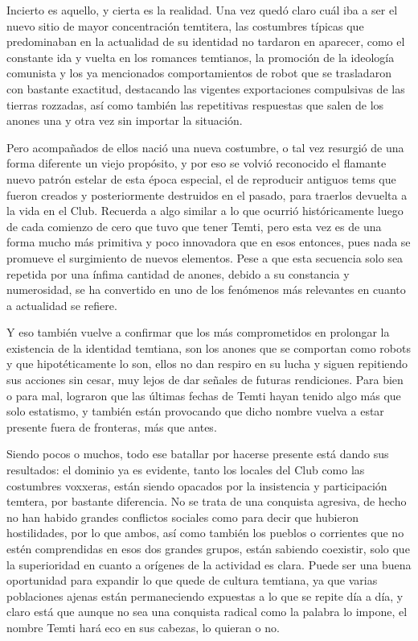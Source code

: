 \documentclass[
  spanish,
]{book}
\begin{document}
Incierto es aquello, y cierta es la realidad. Una vez quedó claro cuál iba a ser el nuevo sitio de mayor concentración temtitera, las costumbres típicas que predominaban en la actualidad de su identidad no tardaron en aparecer, como el constante ida y vuelta en los romances temtianos, la promoción de la ideología comunista y los ya mencionados comportamientos de robot que se trasladaron con bastante exactitud, destacando las vigentes exportaciones compulsivas de las tierras rozzadas, así como también las repetitivas respuestas que salen de los anones una y otra vez sin importar la situación.

Pero acompañados de ellos nació una nueva costumbre, o tal vez resurgió de una forma diferente un viejo propósito, y por eso se volvió reconocido el flamante nuevo patrón estelar de esta época especial, el de reproducir antiguos tems que fueron creados y posteriormente destruidos en el pasado, para traerlos devuelta a la vida en el Club. Recuerda a algo similar a lo que ocurrió históricamente luego de cada comienzo de cero que tuvo que tener Temti, pero esta vez es de una forma mucho más primitiva y poco innovadora que en esos entonces, pues nada se promueve el surgimiento de nuevos elementos. Pese a que esta secuencia solo sea repetida por una ínfima cantidad de anones, debido a su constancia y numerosidad, se ha convertido en uno de los fenómenos más relevantes en cuanto a actualidad se refiere.

Y eso también vuelve a confirmar que los más comprometidos en prolongar la existencia de la identidad temtiana, son los anones que se comportan como robots y que hipotéticamente lo son, ellos no dan respiro en su lucha y siguen repitiendo sus acciones sin cesar, muy lejos de dar señales de futuras rendiciones. Para bien o para mal, lograron que las últimas fechas de Temti hayan tenido algo más que solo estatismo, y también están provocando que dicho nombre vuelva a estar presente fuera de fronteras, más que antes.

Siendo pocos o muchos, todo ese batallar por hacerse presente está dando sus resultados: el dominio ya es evidente, tanto los locales del Club como las costumbres voxxeras, están siendo opacados por la insistencia y participación temtera, por bastante diferencia. No se trata de una conquista agresiva, de hecho no han habido grandes conflictos sociales como para decir que hubieron hostilidades, por lo que ambos, así como también los pueblos o corrientes que no estén comprendidas en esos dos grandes grupos, están sabiendo coexistir, solo que la superioridad en cuanto a orígenes de la actividad es clara. Puede ser una buena oportunidad para expandir lo que quede de cultura temtiana, ya que varias poblaciones ajenas están permaneciendo expuestas a lo que se repite día a día, y claro está que aunque no sea una conquista radical como la palabra lo impone, el nombre Temti hará eco en sus cabezas, lo quieran o no.
\end{document}
